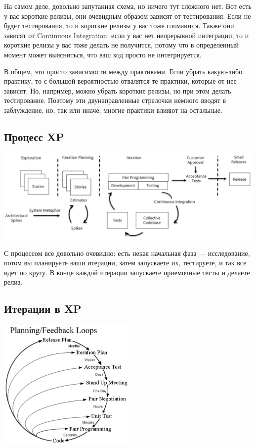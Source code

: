 \documentclass{../../text-style}
\begin{document}
На самом деле, довольно запутанная схема, но ничего тут сложного нет. Вот есть у вас короткие релизы, они очевидным образом зависят от тестирования. Если не будет тестирования, то и короткие релизы у вас тоже сломаются. Также они зависят от Continuous Integration: если у вас нет непрерывной интеграции, то и короткие релизы у вас тоже делать не получится, потому что в определенный момент может выясниться, что ваш код просто не интегрируется.

В общем, это просто зависимости между практиками. Если убрать какую-либо практику, то с большой вероятностью отвалятся те практики, которые от нее зависят. Но, например, можно убрать короткие релизы, но при этом делать тестирование. Поэтому эти двунаправленные стрелочки немного вводят в заблуждение, но, так или иначе, многие практики влияют на остальные.

\subsection{Процесс XP}

\begin{center}
    \includegraphics[width=\textwidth]{xpProcess.png}
\end{center}

С процессом все довольно очевидно: есть некая начальная фаза --- исследование, потом вы планируете ваши итерации, затем запускаете их, тестируете, и так все идет по кругу. В конце каждой итерации запускаете приемочные тесты и делаете релиз.

\subsection{Итерации в XP}

\begin{center}
    \includegraphics[width=0.5\textwidth]{xpIterations.png}
\end{center}
\end{document}
